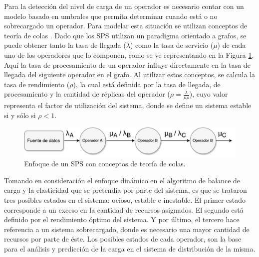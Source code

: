 
Para la detección del nivel de carga de un operador es necesario contar con un modelo basado en umbrales que permita determinar cuando está o no sobrecargado un operador. Para modelar esta situación se utilizan conceptos de teoría de colas \citep{bose2013introduction}. Dado que los SPS utilizan un paradigma orientado a grafos, se puede obtener tanto la tasa de llegada ($\lambda$) como la tasa de servicio ($\mu$) de cada uno de los operadores que lo componen, como se ve representando en la Figura \ref{fig:analisisTeoriaColas}. Aquí la tasa de procesamiento de un operador influye directamente en la tasa de llegada del siguiente operador en el grafo. Al utilizar estos conceptos, se calcula la tasa de rendimiento ($\rho$), la cual está definida por la tasa de llegada, de procesamiento y la cantidad de réplicas del operador ($\rho = \frac{\lambda}{\mu \rho}$), cuyo valor representa el factor de utilización del sistema, donde se define un sistema estable si y sólo si $\rho < 1$.

\begin{figure}[!hb]
	\centering
		\includegraphics[scale=0.6]{images/AnalisisTeoriaColas.pdf}
	\caption{Enfoque de un SPS con conceptos de teoría de colas.}
	\label{fig:analisisTeoriaColas}
\end{figure}

Tomando en consideración el enfoque dinámico en el algoritmo de balance de carga y la elasticidad que se pretendía por parte del sistema, es que se trataron tres posibles estados en el sistema: ocioso, estable e inestable. El primer estado corresponde a un exceso en la cantidad de recursos asignados. El segundo está definido por el rendimiento óptimo del sistema. Y por último, el tercero hace referencia a un sistema sobrecargado, donde es necesario una mayor cantidad de recursos por parte de éste. Los posibles estados de cada operador, son la base para el análisis y predicción de la carga en el sistema de distribución de la misma.

